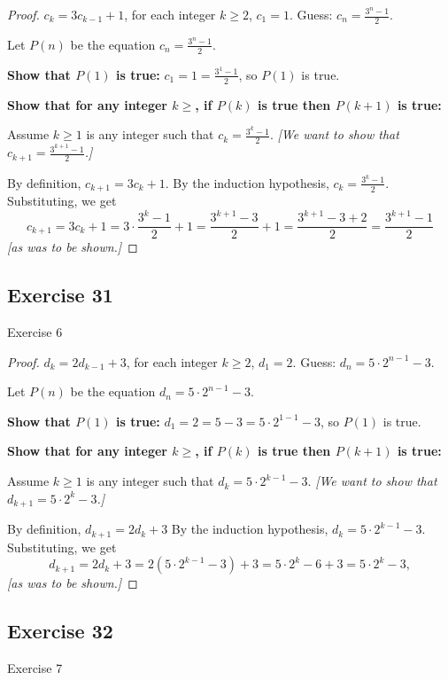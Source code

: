 \documentclass[14pt]{extarticle}
\newcommand{\dps}{\displaystyle}
\begin{document}
\begin{proof}
\(c_k = 3c_{k-1} + 1\), for each integer \(k \geq 2\), \(c_1 = 1\). Guess: \(\dps c_n = \frac{3^n - 1}{2}\).

Let $P(n)$ be the equation \(\dps c_n = \frac{3^n - 1}{2}\).

{\bf Show that \(P(1)\) is true:} \(\dps c_1 = 1 = \frac{3^1 - 1}{2}\), so $P(1)$ is true.

{\bf Show that for any integer \(k \geq \), if \(P(k)\) is true then \(P(k+1)\) is true:}

Assume \(k \geq 1\) is any integer such that \(\dps c_k = \frac{3^k - 1}{2}\). 
{\it [We want to show that \(\dps c_{k+1} = \frac{3^{k+1} - 1}{2}\).]}

By definition, \(c_{k+1} = 3c_k + 1\).
By the induction hypothesis, \(\dps c_k = \frac{3^k - 1}{2}\).
Substituting, we get
\[
c_{k+1} = 3c_k + 1 = 3 \cdot \frac{3^k - 1}{2} + 1 = \frac{3^{k+1} - 3}{2} + 1 
= \frac{3^{k+1} - 3 + 2}{2} = \frac{3^{k+1} - 1}{2}
\]
{\it [as was to be shown.]}
\end{proof}

\subsection{Exercise 31}
Exercise 6

\begin{proof}
\(d_k = 2d_{k-1} + 3\), for each integer \(k \geq 2\), \(d_1 = 2\). Guess: \(\dps d_n = 5 \cdot 2^{n-1} - 3\).

Let $P(n)$ be the equation \(\dps d_n = 5 \cdot 2^{n-1} - 3\).

{\bf Show that \(P(1)\) is true:} \(\dps d_1 = 2 = 5 - 3 = 5 \cdot 2^{1-1} - 3\), so $P(1)$ is true.

{\bf Show that for any integer \(k \geq \), if \(P(k)\) is true then \(P(k+1)\) is true:}

Assume \(k \geq 1\) is any integer such that \(\dps d_k = 5 \cdot 2^{k-1} - 3\). 
{\it [We want to show that \(\dps d_{k+1} = 5 \cdot 2^k - 3\).]}

By definition, \(d_{k+1} = 2d_k + 3\)
By the induction hypothesis, \(d_k = 5 \cdot 2^{k-1} - 3\).
Substituting, we get
\[
d_{k+1} = 2d_k + 3 = 2(5 \cdot 2^{k-1} - 3) + 3 = 5 \cdot 2^k - 6 + 3 = 5 \cdot 2^k - 3,
\]
{\it [as was to be shown.]}
\end{proof}

\subsection{Exercise 32}
Exercise 7
\end{document}
